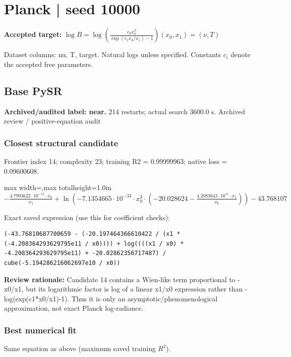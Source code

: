 \documentclass[10pt,letterpaper,landscape]{article}
\begin{document}
\section*{Planck | seed 10000}
\textbf{Accepted target:} $\displaystyle \log B=\log\!\left(\frac{c_0 x_0^3}{\exp(c_1x_0/x_1)-1}\right)$\hfill $(x_0,x_1)=(\nu,T)$\par
{\small Dataset columns: nu, T, target. Natural logs unless specified. Constants $c_i$ denote the accepted free parameters.}\par\medskip
\begin{minipage}[t]{0.485\textwidth}
\subsection*{Base PySR}
\textbf{Archived/audited label: near.} 214 restarts; actual search 3600.0 s.
{\small Archived review / positive-equation audit}
\subsubsection*{Closest structural candidate}
Frontier index 14; complexity 23; training R2 = 0.99999963; native loss = 0.09600608.
\begin{center}\begin{adjustbox}{max width=\linewidth,max totalheight=1.0in}$\displaystyle - \frac{4.7993622 \cdot 10^{-11} \cdot x_{0}}{x_{1}} + \ln{\left(- 7.1354665 \cdot 10^{-33} \cdot x_{0}^{3} \cdot \left(-20.028624 - \frac{4.2083643 \cdot 10^{11} \cdot x_{1}}{x_{0}}\right) \right)} - 43.768107$\end{adjustbox}\end{center}
{\scriptsize Exact saved expression (use this for coefficient checks):}
\begin{lstlisting}
(-43.76810687700659 - (-20.197464366610422 / (x1 * (-4.208364293629795e11 / x0)))) + log((((x1 / x0) * -4.208364293629795e11) + -20.02862356717487) / cube(-5.194286216062697e10 / x0))
\end{lstlisting}
{\small\textbf{Review rationale:} Candidate 14 contains a Wien-like term proportional to -x0/x1, but its logarithmic factor is log of a linear x1/x0 expression rather than -log(exp(c1*x0/x1)-1). Thus it is only an asymptotic/phenomenological approximation, not exact Planck log-radiance.}
\subsubsection*{Best numerical fit}
Same equation as above (maximum saved training $R^2$).
\end{minipage}\hfill
\end{document}
